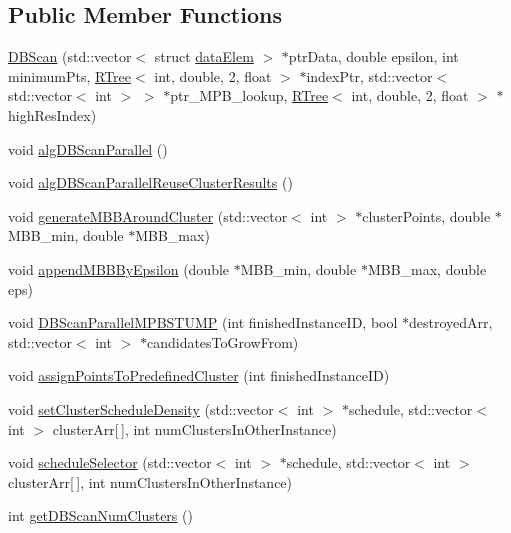 \subsection*{Public Member Functions}
\begin{DoxyCompactItemize}
\item 
\hyperlink{classDBScan_adbbf078f15acf6fae053d8c288b2e97b}{D\-B\-Scan} (std\-::vector$<$ struct \hyperlink{structdataElem}{data\-Elem} $>$ $\ast$ptr\-Data, double epsilon, int minimum\-Pts, \hyperlink{classRTree}{R\-Tree}$<$ int, double, 2, float $>$ $\ast$index\-Ptr, std\-::vector$<$ std\-::vector$<$ int $>$ $>$ $\ast$ptr\-\_\-\-M\-P\-B\-\_\-lookup, \hyperlink{classRTree}{R\-Tree}$<$ int, double, 2, float $>$ $\ast$high\-Res\-Index)
\item 
void \hyperlink{classDBScan_a55a2c6e7364f2780b2032182d3616bde}{alg\-D\-B\-Scan\-Parallel} ()
\item 
void \hyperlink{classDBScan_a7b7115631994fa281c1dca261973e6a5}{alg\-D\-B\-Scan\-Parallel\-Reuse\-Cluster\-Results} ()
\item 
void \hyperlink{classDBScan_a7d85d5c3c8c06c22dd4c77769baf8104}{generate\-M\-B\-B\-Around\-Cluster} (std\-::vector$<$ int $>$ $\ast$cluster\-Points, double $\ast$M\-B\-B\-\_\-min, double $\ast$M\-B\-B\-\_\-max)
\item 
void \hyperlink{classDBScan_a25383a5401de748f1525cd1aa3705afb}{append\-M\-B\-B\-By\-Epsilon} (double $\ast$M\-B\-B\-\_\-min, double $\ast$M\-B\-B\-\_\-max, double eps)
\item 
void \hyperlink{classDBScan_abaad1d98678fbf99b1c6c67fc3474a3f}{D\-B\-Scan\-Parallel\-M\-P\-B\-S\-T\-U\-M\-P} (int finished\-Instance\-I\-D, bool $\ast$destroyed\-Arr, std\-::vector$<$ int $>$ $\ast$candidates\-To\-Grow\-From)
\item 
void \hyperlink{classDBScan_a31e46e492a6b4a6baa6682f8faf0e2de}{assign\-Points\-To\-Predefined\-Cluster} (int finished\-Instance\-I\-D)
\item 
void \hyperlink{classDBScan_a186a8a9666a4b66bd002e8bf568b0747}{set\-Cluster\-Schedule\-Density} (std\-::vector$<$ int $>$ $\ast$schedule, std\-::vector$<$ int $>$ cluster\-Arr\mbox{[}$\,$\mbox{]}, int num\-Clusters\-In\-Other\-Instance)
\item 
void \hyperlink{classDBScan_ab6eb34d3cad064c121cc156920e62270}{schedule\-Selector} (std\-::vector$<$ int $>$ $\ast$schedule, std\-::vector$<$ int $>$ cluster\-Arr\mbox{[}$\,$\mbox{]}, int num\-Clusters\-In\-Other\-Instance)
\item 
int \hyperlink{classDBScan_ab9f99900ed37f14a166d9c9cc486101a}{get\-D\-B\-Scan\-Num\-Clusters} ()
\end{DoxyCompactItemize}
